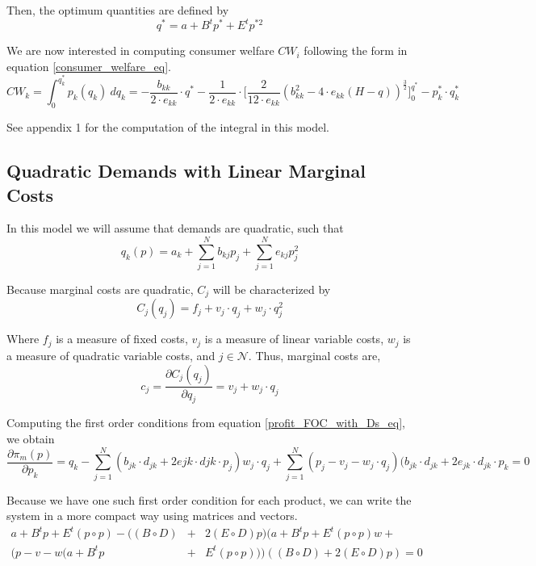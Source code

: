 \documentclass[12pt]{article}
\begin{document}
Then, the optimum quantities are defined by 
\begin{equation*}
q^* = a + B^t p^* + E^t p^{*2}
\end{equation*}

We are now interested in computing consumer welfare $CW_i$ following the form in equation \ref{consumer_welfare_eq}.
\begin{equation*}
CW_k = \int_0^{q_k^*} p_k(q_k) \ dq_k = -\frac{b_{kk}}{2 \cdot e_{kk}} \cdot q^* -\frac{1}{2 \cdot e_{kk}} \cdot \bigg[\frac{2}{12 \cdot e_{kk}} (b_{kk}^2 - 4 \cdot e_{kk}(H - q))^{\frac{3}{2}}\bigg]_0^{q^*} - p_k^* \cdot q_k^*
\end{equation*}

See appendix 1 for the computation of the integral in this model.  

\subsection{Quadratic Demands with Linear Marginal Costs}

In this model we will assume that demands are quadratic, such that
\begin{equation*}
q_k(p) = a_k + \sum_{j = 1}^N b_{kj} p_j + \sum_{j = 1}^N e_{kj}p_j^2
\end{equation*}

Because marginal costs are quadratic, $C_j$ will be characterized by
\begin{equation*}
C_j(q_j) = f_j + v_j \cdot q_j + w_j \cdot q_j^2
\end{equation*}

Where $f_j$ is a measure of fixed costs, $v_j$ is a measure of linear variable costs, $w_j$ is a measure of quadratic variable costs, and $j \in \mathcal{N}$. Thus, marginal costs are,
\begin{equation*}
c_j = \frac{\partial C_j(q_j)}{\partial q_j}= v_j + w_j \cdot q_j
\end{equation*}

Computing the first order conditions from equation \ref{profit_FOC_with_Ds_eq}, we obtain
\begin{equation*}
\frac{\partial \pi_m(p)}{\partial p_k} = q_k - \sum_{j = 1}^N (b_{jk} \cdot d_{jk} + 2e{jk} \cdot d{jk} \cdot p_j) w_j \cdot q_j + \sum_{j = 1}^N (p_j - v_j - w_j \cdot q_j)(b_{jk} \cdot d_{jk} + 2e_{jk} \cdot d_{jk} \cdot p_k = 0
\end{equation*}

Because we have one such first order condition for each product, we can write the system in a more compact way using matrices and vectors. 
\begin{eqnarray*}
a + B^t p + E^t (p \circ p) - ((B \circ D) &+& 2(E \circ D)p) (a + B^t p + E^t (p \circ p) w + \\
(p - v - w(a + B^t p &+& E^t (p \circ p)))((B \circ D) + 2 (E \circ D) p) = 0
\end{eqnarray*}
\end{document}
